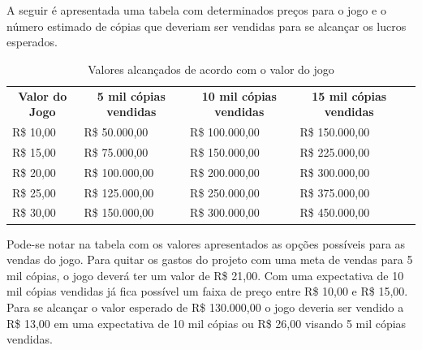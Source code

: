 \documentclass[11pt]{article} %
\begin{document}
A seguir é apresentada uma tabela com determinados preços para o jogo e o número estimado de cópias que deveriam ser vendidas para se alcançar os lucros esperados.

\begin{table}[h]
\begin{tabular}{|l|l|l|l|l}
\cline{1-4}
\multicolumn{1}{|c|}{\textbf{Valor do Jogo}} & \multicolumn{1}{c|}{\textbf{5 mil cópias vendidas}} & \multicolumn{1}{c|}{\textbf{10 mil cópias vendidas}} & \multicolumn{1}{c|}{\textbf{15 mil cópias vendidas}} &  \\ \cline{1-4}
R\$ 10,00                                    & R\$ 50.000,00                                        & R\$ 100.000,00                                        & R\$ 150.000,00                                     &  \\ \cline{1-4}
R\$ 15,00                                    & R\$ 75.000,00                                        & R\$ 150.000,00                                        & R\$ 225.000,00                                     &  \\ \cline{1-4}
R\$ 20,00                                    & R\$ 100.000,00                                       & R\$ 200.000,00                                        & R\$ 300.000,00                                     &  \\ \cline{1-4}
R\$ 25,00                                    & R\$ 125.000,00                                       & R\$ 250.000,00                                        & R\$ 375.000,00                                     &  \\ \cline{1-4}
R\$ 30,00                                    & R\$ 150.000,00                                       & R\$ 300.000,00                                        & R\$ 450.000,00                                     &  \\ \cline{1-4}
\end{tabular}
\caption{Valores alcançados de acordo com o valor do jogo}
\end{table}

Pode-se notar na tabela com os valores apresentados as opções possíveis para as vendas do jogo. Para quitar os gastos do projeto com uma meta de vendas para 5 mil cópias, o jogo deverá ter um valor de R\$ 21,00. Com uma expectativa de 10 mil cópias vendidas já fica possível um faixa de preço entre R\$ 10,00 e R\$ 15,00. Para se alcançar o valor esperado de R\$ 130.000,00 o jogo deveria ser vendido a R\$ 13,00 em uma expectativa de 10 mil cópias ou R\$ 26,00 visando 5 mil cópias vendidas.
\end{document}
